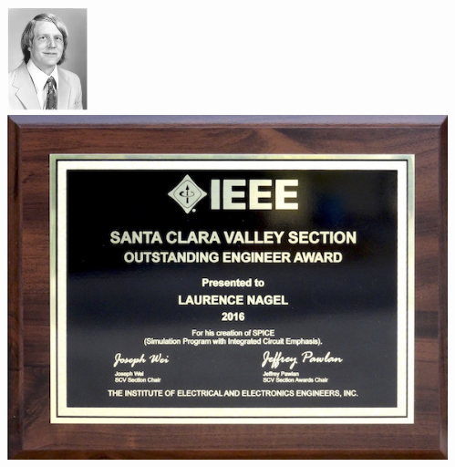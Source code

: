 \begin{frame}
\begin{columns}
\begin{column}{.7\textwidth}
{      }
    \end{column}
    \begin{column}{.3\textwidth}
      \begin{center}
        \includegraphics[height=3cm]{images/Larry-Nagel-portrait-young.png} \\[1cm]
        \includegraphics[width=.7\textwidth]{images/Nagel_Plaque-SCV-2016.png}
      \end{center}
    \end{column}
  \end{columns}
\end{frame}

